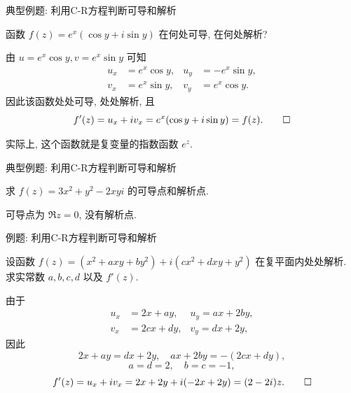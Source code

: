 \begin{frame}{典型例题: 利用C-R方程判断可导和解析}
\begin{example}
函数 $f(z)=e^x(\cos y+i\sin y)$ 在何处可导, 在何处解析?
\end{example}
\begin{solution}
由 $u=e^x\cos y,v=e^x\sin y$
\onslide<+->
可知
\begin{align*}
u_x&=e^x\cos y,&u_y&=-e^x\sin y,\\
v_x&=e^x\sin y,&v_y&=e^x\cos y.
\end{align*}
\onslide<+->
因此该函数处处可导, 处处解析, 且
\[f'(z)=u_x+iv_x=e^x(\cos y+i\sin y)=f(z).\qedhere\]
\end{solution}
\onslide<+->
实际上, 这个函数就是复变量的指数函数 $e^z$.
\end{frame}


\begin{frame}{典型例题: 利用C-R方程判断可导和解析}
\begin{exercise}
求 $f(z)=3x^2+y^2-2xyi$ 的可导点和解析点.
\end{exercise}
\begin{answer}
可导点为 $\Re z=0$, 没有解析点.
\end{answer}
\end{frame}


\begin{frame}{例题: 利用C-R方程判断可导和解析}
\beqskip{4pt}
\begin{example}
设函数 $f(z)=(x^2+axy+by^2)+i(cx^2+dxy+y^2)$ 在复平面内处处解析. 求实常数 $a,b,c,d$ 以及 $f'(z)$.
\end{example}
\begin{solution}
由于
\begin{align*}
u_x&=2x+ay,&u_y=ax+2by,\\
v_x&=2cx+dy,&v_y=dx+2y,
\end{align*}
\onslide<+->
因此
\[2x+ay=dx+2y,\quad ax+2by=-(2cx+dy),\]
\vspace{-\baselineskip}
\onslide<+->
\[a=d=2,\quad b=c=-1,\]
\vspace{-\baselineskip}
\onslide<+->
\[f'(z)=u_x+iv_x=2x+2y+i(-2x+2y)=(2-2i)z.\qedhere\]
\end{solution}
\endgroup
\end{frame}


